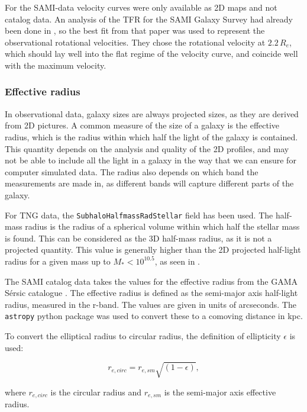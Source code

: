 For the SAMI-data velocity curves were only available as 2D maps and not catalog data. An analysis of the TFR for the SAMI Galaxy Survey had already been done in \cite{Bloom2017}, so the best fit from that paper was used to represent the observational rotational velocities. They chose the rotational velocity at $2.2\, R_e$, which should lay well into the flat regime of the velocity curve, and coincide well with the maximum velocity.


\subsubsection{Effective radius}
In observational data, galaxy sizes are always projected sizes, as they are derived from 2D pictures. A common measure of the size of a galaxy is the effective radius, which is the radius within which half the light of the galaxy is contained. This quantity depends on the analysis and quality of the 2D profiles, and may not be able to include all the light in a galaxy in the way that we can ensure for computer simulated data. The radius also depends on which band the measurements are made in, as different bands will capture different parts of the galaxy.

For TNG data, the \texttt{SubhaloHalfmassRadStellar} field has been used. The half-mass radius is the radius of a spherical volume within which half the stellar mass is found. This can be considered as the 3D half-mass radius, as it is not a projected quantity. This value is generally higher than the 2D projected half-light radius for a given mass up to $M_{*} < 10^{10.5}$, as seen in \parencite{Genel2017}.

The SAMI catalog data takes the values for the effective radius from the GAMA Sérsic catalogue \parencite{Kelvin2012}. The effective radius is defined as the semi-major axis half-light radius, measured in the r-band. The values are given in units of arcseconds. The \texttt{astropy} python package was used to convert these to a comoving distance in kpc.


To convert the elliptical radius to circular radius, the definition of ellipticity $\epsilon$ is used:

\begin{equation}
   r_{e, circ} = r_{e,sm}\sqrt{(1-\epsilon)},
\end{equation}

where $r_{e, circ}$ is the circular radius and $r_{e,sm}$ is the semi-major axis effective radius.
